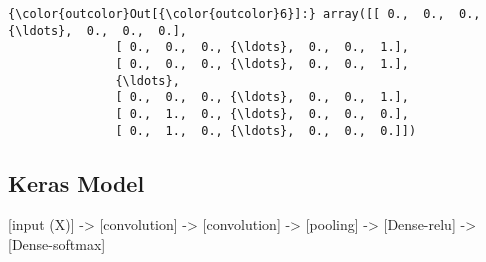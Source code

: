 \documentclass[11pt]{article}
\begin{document}
\begin{Verbatim}[commandchars=\\\{\}]
{\color{outcolor}Out[{\color{outcolor}6}]:} array([[ 0.,  0.,  0., {\ldots},  0.,  0.,  0.],
               [ 0.,  0.,  0., {\ldots},  0.,  0.,  1.],
               [ 0.,  0.,  0., {\ldots},  0.,  0.,  1.],
               {\ldots}, 
               [ 0.,  0.,  0., {\ldots},  0.,  0.,  1.],
               [ 0.,  1.,  0., {\ldots},  0.,  0.,  0.],
               [ 0.,  1.,  0., {\ldots},  0.,  0.,  0.]])
\end{Verbatim}
            
    \hypertarget{keras-model}{%
\subsection{Keras Model}\label{keras-model}}

{[}input (X){]} -\textgreater{} {[}convolution{]} -\textgreater{}
{[}convolution{]} -\textgreater{} {[}pooling{]} -\textgreater{}
{[}Dense-relu{]} -\textgreater{} {[}Dense-softmax{]}
\end{document}
